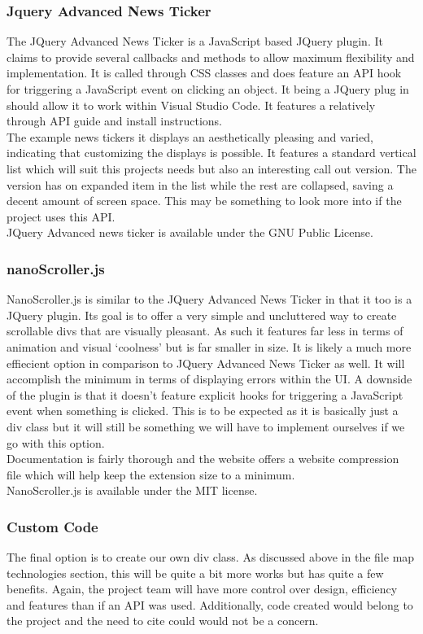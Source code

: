 \documentclass[letterpaper,10pt,titlepage,draftclsnofoot,onecolumn,onesided] {IEEEtran}
\begin{document}
\subsubsection{Jquery Advanced News Ticker}
The JQuery Advanced News Ticker is a JavaScript based JQuery plugin. 
It claims to provide several callbacks and methods to allow maximum flexibility and implementation. 
It is called through CSS classes and does feature an API hook for triggering a JavaScript event on clicking an object. 
It being a JQuery plug in should allow it to work within Visual Studio Code. 
It features a relatively through API guide and install instructions.
\\
The example news tickers it displays an aesthetically pleasing and varied, indicating that customizing the displays is possible. 
It features a standard vertical list which will suit this projects needs but also an interesting call out version. 
The version has on expanded item in the list while the rest are collapsed, saving a decent amount of screen space. 
This may be something to look more into if the project uses this API.
\\
JQuery Advanced news ticker is available under the GNU Public License.

\subsubsection{nanoScroller.js}
NanoScroller.js is similar to the JQuery Advanced News Ticker in that it too is a JQuery plugin. 
Its goal is to offer a very simple and uncluttered way to create scrollable divs that are visually pleasant. 
As such it features far less in terms of animation and visual ‘coolness’ but is far smaller in size. 
It is likely a much more effiecient option in comparison to JQuery Advanced News Ticker as well. 
It will accomplish the minimum in terms of displaying errors within the UI. 
A downside of the plugin is that it doesn’t feature explicit hooks for triggering a JavaScript event when something is clicked. 
This is to be expected as it is basically just a div class but it will still be something we will have to implement ourselves if we go with this option.
\\
Documentation is fairly thorough and the website offers a website compression file which will help keep the extension size to a minimum. 
\\
NanoScroller.js is available under the MIT license. 

\subsubsection{Custom Code}
The final option is to create our own div class. 
As discussed above in the file map technologies section, this will be quite a bit more works but has quite a few benefits. 
Again, the project team will have more control over design, efficiency and features than if an API was used. 
Additionally, code created would belong to the project and the need to cite could would not be a concern.
\end{document}
